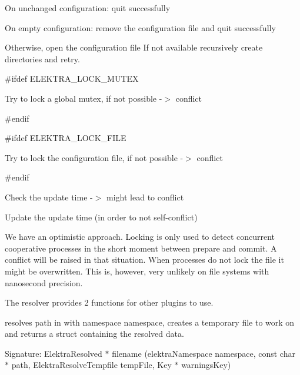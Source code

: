 \begin{DoxyEnumerate}
\item On unchanged configuration\+: quit successfully
\item On empty configuration\+: remove the configuration file and quit successfully
\item Otherwise, open the configuration file If not available recursively create directories and retry.
\end{DoxyEnumerate}

\#ifdef E\+L\+E\+K\+T\+R\+A\+\_\+\+L\+O\+C\+K\+\_\+\+M\+U\+T\+EX


\begin{DoxyEnumerate}
\item Try to lock a global mutex, if not possible -\/$>$ conflict
\end{DoxyEnumerate}

\#endif

\#ifdef E\+L\+E\+K\+T\+R\+A\+\_\+\+L\+O\+C\+K\+\_\+\+F\+I\+LE


\begin{DoxyEnumerate}
\item Try to lock the configuration file, if not possible -\/$>$ conflict
\end{DoxyEnumerate}

\#endif


\begin{DoxyEnumerate}
\item Check the update time -\/$>$ might lead to conflict
\item Update the update time (in order to not self-\/conflict)
\end{DoxyEnumerate}

We have an optimistic approach. Locking is only used to detect concurrent cooperative processes in the short moment between prepare and commit. A conflict will be raised in that situation. When processes do not lock the file it might be overwritten. This is, however, very unlikely on file systems with nanosecond precision.

The resolver provides 2 functions for other plugins to use.

resolves {\ttfamily path} in with namespace {\ttfamily namespace}, creates a temporary file to work on and returns a struct containing the resolved data.

Signature\+: {\ttfamily Elektra\+Resolved $\ast$ filename (elektra\+Namespace namespace, const char $\ast$ path, Elektra\+Resolve\+Tempfile temp\+File, Key $\ast$ warnings\+Key)}

